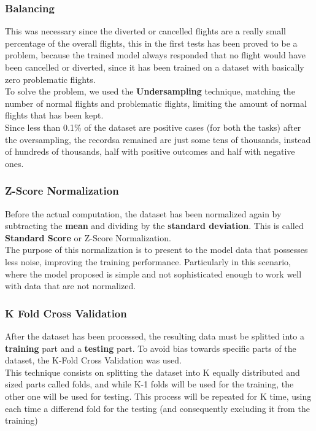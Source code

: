 \documentclass[
	letterpaper, %
	10pt, %
]{class}
\begin{document}
\subsubsection{Balancing}

This was necessary since the diverted or cancelled flights are a really small percentage of the overall flights,
this in the first tests has been proved to be a problem, because the trained model always responded that no flight would have been cancelled or diverted, since it has been trained on a dataset with basically zero problematic flights.\\

To solve the problem, we used the \textbf{Undersampling} technique, matching the number of normal flights and problematic flights, limiting the amount of normal flights that has been kept.\\

Since less than 0.1\% of the dataset are positive cases (for both the tasks) after the oversampling, the recordsa remained are just some tens of thousands, instead of hundreds of thousands, half with positive outcomes and half with negative ones.

\subsubsection{Z-Score Normalization}
Before the actual computation, the dataset has been normalized again by subtracting the \textbf{mean} and dividing by the \textbf{standard deviation}. This is called \textbf{Standard Score} \cite{normalization} or Z-Score Normalization.\\

The purpose of this normalization is to present to the model data that possesses less noise, improving the training performance. Particularly in this scenario, where the model proposed is simple and not sophisticated enough to work well with data that are not normalized.

\subsubsection{K Fold Cross Validation}
After the dataset has been processed, the resulting data must be splitted into a \textbf{training} part and a \textbf{testing} part. To avoid bias towards specific parts of the dataset, the K-Fold Cross Validation \cite{crossvalidation} was used.\\

This technique consists on splitting the dataset into K equally distributed and sized parts called folds, and while K-1 folds will be used for the training, the other one will be used for testing. This process will be repeated for K time, using each time a differend fold for the testing (and consequently excluding it from the training)\\
\end{document}
